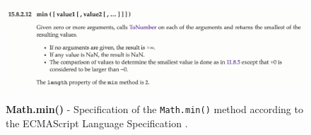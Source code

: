 \begin{figure}[tp]
	\begin{centering}
		{\includegraphics[width=1\textwidth]{figures/approach/type-inference/behavior_correctness/ecma-script-min-specification.png}}
		\caption[Math.min()]{\textbf{Math.min()} - Specification of the \texttt{Math.min()} method according to the ECMAScript Language Specification \citep{ecma-script}.}
		\label{fig:type-inference-ecma-script-min-specification}
	\end{centering}
\end{figure}